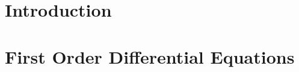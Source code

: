 \documentclass[12pt,letterpaper]{article}
\newcommand{\chapter}[2]{
  \section{#2}
  
  \newpage
}
\begin{document}
\chapter{1}{Introduction}
\chapter{2}{First Order Differential Equations}
\end{document}
